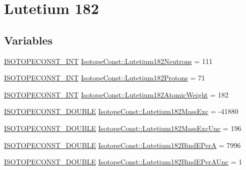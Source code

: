 \hypertarget{group___isotope_const-_lutetium-_lu182}{}\section{Lutetium 182}
\label{group___isotope_const-_lutetium-_lu182}
\subsection*{Variables}
\begin{DoxyCompactItemize}
\item 
\mbox{\hyperlink{group___isotope_const-_macros_ga5f18360b3e99483a35c32d789e62621c}{I\+S\+O\+T\+O\+P\+E\+C\+O\+N\+S\+T\+\_\+\+I\+NT}} \mbox{\hyperlink{group___isotope_const-_lutetium-_lu182_gac954a6d8a738e3d5cd0f38f907db15c6}{Isotope\+Const\+::\+Lutetium182\+Neutrons}} = 111
\item 
\mbox{\hyperlink{group___isotope_const-_macros_ga5f18360b3e99483a35c32d789e62621c}{I\+S\+O\+T\+O\+P\+E\+C\+O\+N\+S\+T\+\_\+\+I\+NT}} \mbox{\hyperlink{group___isotope_const-_lutetium-_lu182_ga10879a8bfc9fcb8208259f0fd327c843}{Isotope\+Const\+::\+Lutetium182\+Protons}} = 71
\item 
\mbox{\hyperlink{group___isotope_const-_macros_ga5f18360b3e99483a35c32d789e62621c}{I\+S\+O\+T\+O\+P\+E\+C\+O\+N\+S\+T\+\_\+\+I\+NT}} \mbox{\hyperlink{group___isotope_const-_lutetium-_lu182_ga5676915ecb6afaa303cb36b2278cef2d}{Isotope\+Const\+::\+Lutetium182\+Atomic\+Weight}} = 182
\item 
\mbox{\hyperlink{group___isotope_const-_macros_ga8f45a7272ce02c0b4c65c44636ed719a}{I\+S\+O\+T\+O\+P\+E\+C\+O\+N\+S\+T\+\_\+\+D\+O\+U\+B\+LE}} \mbox{\hyperlink{group___isotope_const-_lutetium-_lu182_gad0fae66ed18a58c72f4451c06cd4dddf}{Isotope\+Const\+::\+Lutetium182\+Mass\+Exc}} = -\/41880
\item 
\mbox{\hyperlink{group___isotope_const-_macros_ga8f45a7272ce02c0b4c65c44636ed719a}{I\+S\+O\+T\+O\+P\+E\+C\+O\+N\+S\+T\+\_\+\+D\+O\+U\+B\+LE}} \mbox{\hyperlink{group___isotope_const-_lutetium-_lu182_ga109f353798bfbc2a426a79568d67d6d8}{Isotope\+Const\+::\+Lutetium182\+Mass\+Exc\+Unc}} = 196
\item 
\mbox{\hyperlink{group___isotope_const-_macros_ga8f45a7272ce02c0b4c65c44636ed719a}{I\+S\+O\+T\+O\+P\+E\+C\+O\+N\+S\+T\+\_\+\+D\+O\+U\+B\+LE}} \mbox{\hyperlink{group___isotope_const-_lutetium-_lu182_gacb8ec1c44f38d731ca319fbc86f48e01}{Isotope\+Const\+::\+Lutetium182\+Bind\+E\+PerA}} = 7996
\item 
\mbox{\hyperlink{group___isotope_const-_macros_ga8f45a7272ce02c0b4c65c44636ed719a}{I\+S\+O\+T\+O\+P\+E\+C\+O\+N\+S\+T\+\_\+\+D\+O\+U\+B\+LE}} \mbox{\hyperlink{group___isotope_const-_lutetium-_lu182_ga3c99f193ae0648a4f0218df62b60a711}{Isotope\+Const\+::\+Lutetium182\+Bind\+E\+Per\+A\+Unc}} = 1

\end{DoxyCompactItemize}
